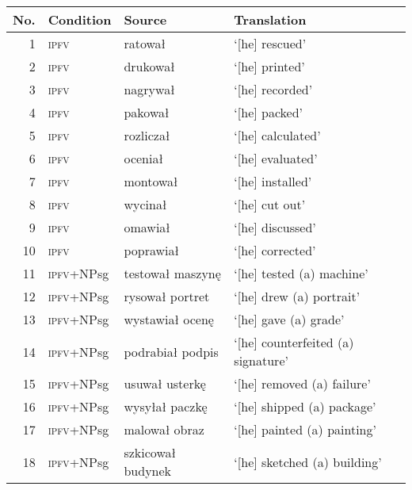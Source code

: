 \documentclass[output=paper]{langscibook}
\begin{document}
\begin{table}[H]
\small
\begin{tabular}{rlll}
    \lsptoprule
No. & Condition  & Source & Translation\\\midrule                                                                  
1& \textsc{ipfv}&ratował              & `[he] rescued'\\                                            
2& \textsc{ipfv}&drukował             & `[he] printed'\\                                           
3& \textsc{ipfv}&nagrywał             & `[he] recorded'\\                                          
4& \textsc{ipfv}&pakował              & `[he] packed'\\                                             
5& \textsc{ipfv}&rozliczał            & `[he] calculated'\\                                       
6& \textsc{ipfv}&oceniał              & `[he] evaluated'\\                                          
7& \textsc{ipfv}&montował             & `[he] installed'\\                                         
8& \textsc{ipfv}&wycinał              & `[he] cut out'\\                                            
9& \textsc{ipfv}&omawiał              & `[he] discussed'\\                                          
10& \textsc{ipfv}&poprawiał           & `[he] corrected'\\                                        
11& \textsc{ipfv}+NPsg&testował maszynę&   `[he] tested (a) machine'\\          
12& \textsc{ipfv}+NPsg&rysował portret&   `[he] drew (a) portrait'\\            
13& \textsc{ipfv}+NPsg&wystawiał ocenę&   `[he] gave (a) grade'\\               
14& \textsc{ipfv}+NPsg&podrabiał podpis&   `[he] counterfeited (a) signature'\\ 
15& \textsc{ipfv}+NPsg&usuwał usterkę&   `[he] removed (a) failure'\\           
16& \textsc{ipfv}+NPsg&wysyłał paczkę&   `[he] shipped (a) package'\\           
17& \textsc{ipfv}+NPsg&malował obraz&   `[he] painted (a) painting'\\           
18& \textsc{ipfv}+NPsg&szkicował budynek&   `[he] sketched (a) building'\\      

\end{tabular}
\end{table}
\end{document}
